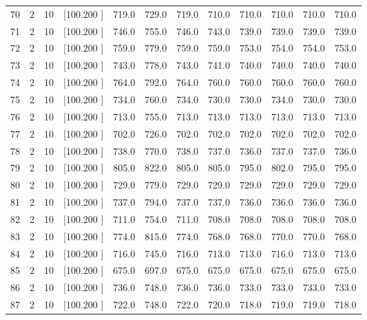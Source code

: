 \documentclass[12pt,a4paper]{article}
\begin{document}
\begin{center}
{\begin{tabular}{r r r r r r r r r r r r}
  70&  2& 10&[100.200   ]&   719.0&   729.0&   719.0&   710.0&   710.0&   710.0&   710.0&   710.0\\[-0.02in]
  71&  2& 10&[100.200   ]&   746.0&   755.0&   746.0&   743.0&   739.0&   739.0&   739.0&   739.0\\[-0.02in]
  72&  2& 10&[100.200   ]&   759.0&   779.0&   759.0&   759.0&   753.0&   754.0&   754.0&   753.0\\[-0.02in]
  73&  2& 10&[100.200   ]&   743.0&   778.0&   743.0&   741.0&   740.0&   740.0&   740.0&   740.0\\[-0.02in]
  74&  2& 10&[100.200   ]&   764.0&   792.0&   764.0&   760.0&   760.0&   760.0&   760.0&   760.0\\[-0.02in]
  75&  2& 10&[100.200   ]&   734.0&   760.0&   734.0&   730.0&   730.0&   734.0&   730.0&   730.0\\[-0.02in]
  76&  2& 10&[100.200   ]&   713.0&   755.0&   713.0&   713.0&   713.0&   713.0&   713.0&   713.0\\[-0.02in]
  77&  2& 10&[100.200   ]&   702.0&   726.0&   702.0&   702.0&   702.0&   702.0&   702.0&   702.0\\[-0.02in]
  78&  2& 10&[100.200   ]&   738.0&   770.0&   738.0&   737.0&   736.0&   737.0&   737.0&   736.0\\[-0.02in]
  79&  2& 10&[100.200   ]&   805.0&   822.0&   805.0&   805.0&   795.0&   802.0&   795.0&   795.0\\[-0.02in]
  80&  2& 10&[100.200   ]&   729.0&   779.0&   729.0&   729.0&   729.0&   729.0&   729.0&   729.0\\[-0.02in]
  81&  2& 10&[100.200   ]&   737.0&   794.0&   737.0&   737.0&   736.0&   736.0&   736.0&   736.0\\[-0.02in]
  82&  2& 10&[100.200   ]&   711.0&   754.0&   711.0&   708.0&   708.0&   708.0&   708.0&   708.0\\[-0.02in]
  83&  2& 10&[100.200   ]&   774.0&   815.0&   774.0&   768.0&   768.0&   770.0&   770.0&   768.0\\[-0.02in]
  84&  2& 10&[100.200   ]&   716.0&   745.0&   716.0&   713.0&   713.0&   716.0&   713.0&   713.0\\[-0.02in]
  85&  2& 10&[100.200   ]&   675.0&   697.0&   675.0&   675.0&   675.0&   675.0&   675.0&   675.0\\[-0.02in]
  86&  2& 10&[100.200   ]&   736.0&   748.0&   736.0&   736.0&   733.0&   733.0&   733.0&   733.0\\[-0.02in]
  87&  2& 10&[100.200   ]&   722.0&   748.0&   722.0&   720.0&   718.0&   719.0&   719.0&   718.0\\[-0.02in]

\end{tabular}}
\end{center}
\end{document}
